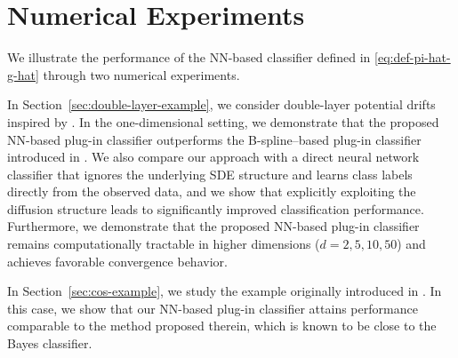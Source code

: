 \documentclass{article}
\theoremstyle{plain}
\newtheorem{corollary}[theorem]{Corollary}
\theoremstyle{definition}
\theoremstyle{remark}
\newcommand{\calF}{\mathcal{F}}
\newcommand{\calR}{\mathcal{R}}
\newcommand{\rr}{\color{red}}
\newcommand{\black}{\color{black}}
\newcommand{\nnset}{\mathcal{F}(L, \mathbf{p}, s, F)}
\begin{document}


\section{Numerical Experiments}\label{sec:numerical-part}

We illustrate the performance of the NN-based classifier defined in \eqref{eq:def-pi-hat-g-hat} through two numerical experiments. 

In Section~\ref{sec:double-layer-example}, we consider  double-layer potential drifts inspired by \citet{zhao2025drift}. In the one-dimensional setting, we demonstrate that the proposed NN-based plug-in classifier outperforms the B-spline–based plug-in classifier introduced in \citet{Denis2024}. We also compare our approach with a direct neural network classifier that ignores the underlying SDE structure and learns class labels directly from the observed data, and we show that explicitly exploiting the diffusion structure leads to significantly improved classification performance. Furthermore, we demonstrate that the proposed NN-based plug-in classifier remains computationally tractable in higher dimensions ($d=2,5,10,50$) and achieves favorable convergence behavior.

In Section~\ref{sec:cos-example}, we study the example originally introduced in \citet{Denis2024}. In this case, we show that our NN-based plug-in classifier attains performance comparable to the method proposed therein, which is known to be close to the Bayes classifier.
\end{document}
